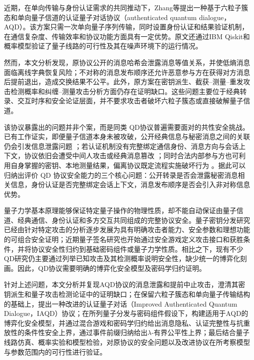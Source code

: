 \documentclass[UTF8,10pt,a4paper]{ctexart}
\theoremstyle{aqdplain}
\begin{document}
近期，在单向传输与身份认证需求的共同推动下，Zhang等提出一种基于六粒子簇态和单向量子信道的认证量子对话协议（authenticated quantum dialogue，AQD）\citep{zhang2025aqd}。该方案只需一次单向量子序列传输，同时设置身份认证和结果验证机制，在通信复杂度、传输效率和协议功能方面具有一定优势。原文还通过IBM Qiskit和概率模型验证了量子线路的可行性及其在噪声环境下的运行情况。

然而，本文分析发现，原协议公开的消息哈希会泄露消息等值关系，并使低熵消息面临离线字典恢复风险；不对称的消息发布顺序还允许恶意参与方在获得对方消息后提前退出，造成交换结果不公平。此外，原方案在密钥派生、截获--测量--重发攻击检测概率和纠缠--测量攻击分析方面仍存在证明缺口。这些问题主要位于经典转录、交互时序和安全论证层面，并不要求攻击者破坏六粒子簇态或直接破解量子信道。

该协议暴露出的问题并非个案，而是同类 QD协议普遍需要面对的共性安全挑战。已有工作证实，即便量子信道本身未被攻破，公开经典信息与秘密消息之间的关联仍会引发信息泄露问题 \citep {gao2008revisiting,liu2019revising,ye2022dialogue}；若认证机制没有完整绑定通信身份、消息方向与会话上下文，协议依旧会遭受中间人攻击或经典消息篡改 \citep {shen2013auth,lin2013mitm}；同时合法内部参与方也可利用自身掌握的密钥、本地测量结果，偏离协议既定流程实施破坏行为 \citep {zhang2025dishonest}。据此可以归纳出评价 QD 协议安全能力的三个核心问题：公开转录是否会泄露秘密消息相关信息，身份认证是否完整绑定会话上下文，消息发布顺序是否会引入非对称信息优势。

量子力学基本原理能够保证特定量子操作的物理性质，却不能自动保证由量子信道、经典通信、身份认证和多方交互共同组成的完整协议安全。量子密钥分发研究已经由针对特定攻击的分析逐步发展为具有明确攻击者能力、安全参数和理想功能的可组合安全证明\citep{shor2000simple,portmann2014qkd}；近期量子签名研究也开始通过安全游戏定义攻击接口和获胜条件，并将协议安全性归约到基础密码组件或量子力学性质\citep{zhang2026qbs}。相比之下，现有不少QD研究仍主要通过列举已知攻击及其检测概率说明安全性，缺少统一的博弈化刻画。因此，QD协议需要明确的博弈化安全模型及密码学归约证明。

针对上述问题，本文分析并复现AQD协议的消息泄露和提前中止攻击，澄清其密钥派生和量子攻击检测论证中的证明缺口；在保留六粒子簇态和单向量子传输结构的基础上，提出一种改进的认证量子对话（Improved Authenticated Quantum Dialogue，IAQD）协议；在所列量子分发与密码组件假设下，构建适用于AQD的博弈化安全模型，并通过混合游戏和密码学归约给出消息隐私、认证完整性与抗重放性的条件性安全上界，通过事件前缀归纳给出$\lambda$-有界公平性上界；最后结合量子线路仿真、概率实验和模型检验，对原协议的安全问题以及改进协议在所考察模型与参数范围内的可行性进行验证。
\end{document}
